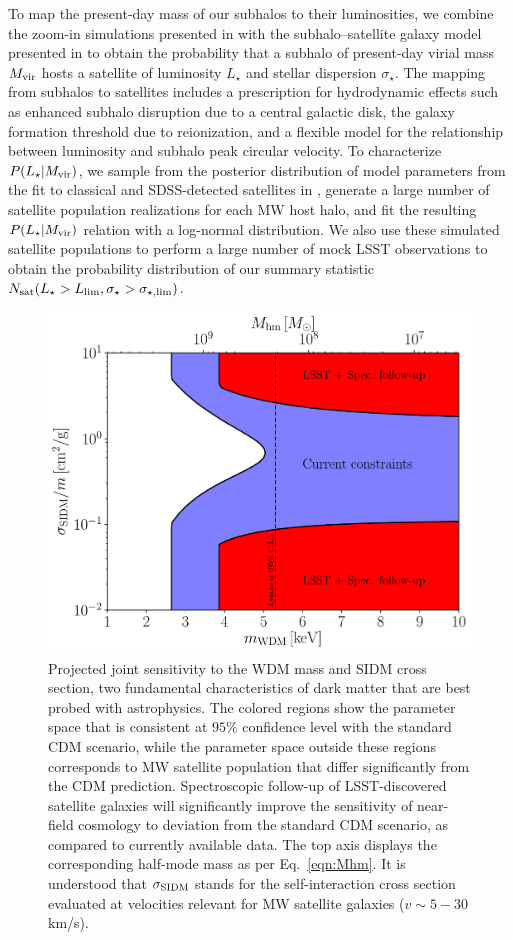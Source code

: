 To map the present-day mass of our subhalos to their luminosities, we combine the zoom-in simulations presented in \cite{Mao2015} with the subhalo--satellite galaxy model presented in \cite{Nadler:2018} to obtain the probability that a subhalo of present-day virial mass $M_{\rm{vir}}$ hosts a satellite of luminosity $L_\star$ and stellar dispersion $\sigma_\star$. The mapping from subhalos to satellites includes a prescription for hydrodynamic effects such as enhanced subhalo disruption due to a central galactic disk, the galaxy formation threshold due to reionization, and a flexible model for the relationship between luminosity and subhalo peak circular velocity. To characterize $P(L_\star|M_{\rm{vir}})$, we sample from the posterior distribution of model parameters from the fit to classical and SDSS-detected satellites in \cite{Nadler:2018}, generate a large number of satellite population realizations for each MW host halo, and fit the resulting $P(L_\star|M_{\rm{vir}})$ relation with a log-normal distribution. We also use these simulated satellite populations to perform a large number of mock LSST observations to obtain the probability distribution of our summary statistic $N_{\rm sat}(L_\star>L_{\rm lim}, \sigma_\star> \sigma_{\star,\rm lim})$.

\begin{figure}
\centering
\includegraphics[width=0.6\columnwidth]{figures/SIDM_WDM_figw_coll.pdf}
\caption{\label{fig:sidm_wdm} Projected joint sensitivity to the WDM mass and SIDM cross section, two fundamental characteristics of dark matter that are best probed with astrophysics. The colored regions show the parameter space that is consistent at $95\%$ confidence level with the standard CDM scenario, while the parameter space outside these regions corresponds to MW satellite population that differ significantly from the CDM prediction. Spectroscopic follow-up of LSST-discovered satellite galaxies will significantly improve the sensitivity of near-field cosmology to deviation from the standard CDM scenario, as compared to currently available data. The top axis displays the corresponding half-mode mass as per Eq.~\eqref{eqn:Mhm}. It is understood that $\sigma_{\rm SIDM}$ stands for the self-interaction cross section evaluated at velocities relevant for MW satellite galaxies ($v\sim5-30$ km/s). }
\end{figure}

